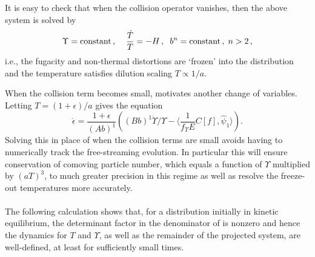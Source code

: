 It is easy to check that when the collision operator vanishes, then the above system is solved by 
\begin{equation}\label{freeStreamSol}
\Upsilon=\text{constant}\,,\hspace{4mm} \frac{\dot T}{T}=-H\,,\hspace{2mm}  b^n=\text{constant}\,,\hspace{1mm} n>2\,,
\end{equation}
i.e., the fugacity and non-thermal distortions are `frozen' into the distribution and the temperature satisfies dilution scaling $T\propto 1/a$.

When the collision term becomes small,  motivates another change of variables. Letting $T=(1+\epsilon)/a$  gives the equation
\begin{equation}
\dot\epsilon=\frac{1+\epsilon}{(Ab)^1}\left((Bb)^1\dot{\Upsilon}/\Upsilon-\langle\frac{1}{f_\Upsilon E}C[f],\hat\psi_1\rangle\right).
\end{equation}
Solving this in place of  when the collision terms are small avoids having to numerically track the free-streaming evolution. In particular this will ensure conservation of comoving particle number, which equals a function of $\Upsilon$ multiplied by $(aT)^3$, to much greater precision in this regime as well as resolve the freeze-out temperatures more accurately.\\

\\
The following calculation shows that, for a distribution initially in kinetic equilibrium, the determinant factor in the denominator of  is nonzero and hence the dynamics for $T$ and $\Upsilon$, as well as the remainder of the projected system, are well-defined, at least for sufficiently small times. 

